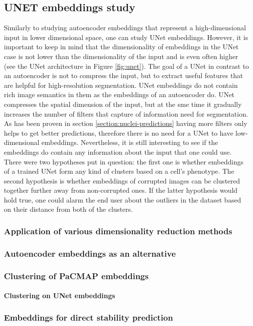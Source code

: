 \subsection{UNET embeddings study}
    Similarly to studying autoencoder embeddings that represent a high-dimensional input in lower dimensional space, one can study UNet embeddings. However, it is important to keep in mind that the dimensionality of embeddings in the UNet case is not lower than the dimensionality of the input and is even often higher (see the UNet architecture in Figure \ref{fig:unet}). The goal of a UNet in contrast to an autoencoder is not to compress the input, but to extract useful features that are helpful for high-resolution segmentation. UNet embeddings do not contain rich image semantics in them as the embeddings of an autoencoder do. UNet compresses the spatial dimension of the input, but at the sme time it gradually increases the number of filters that capture of information need for segmentation. As has been proven in section \ref{section:nuclei-predictions} having more filters only helps to get better predictions, therefore there is no need for a UNet to have low-dimensional embeddings. Nevertheless, it is still interesting to see if the embeddings do contain any information about the input that one could use. There were two hypotheses put in question: the first one is whether embeddings of a trained UNet form any kind of clusters based on a cell's phenotype. The second hypothesis is whether embeddings of corrupted images can be clustered together further away from non-corrupted ones. If the latter hypothesis would hold true, one could alarm the end user about the outliers in the dataset based on their distance from both of the clusters. 
    \subsubsection{Application of various dimensionality reduction methods}
        \label{section:unet-embeddings-dim-reduction}
        
    \subsubsection{Autoencoder embeddings as an alternative}
        
    \subsubsection{Clustering of PaCMAP embeddings}
        \paragraph{Clustering on UNet embeddings}
        \label{section:clustering-on-unet-embeddings}
        
    \subsubsection{Embeddings for direct stability prediction}
        